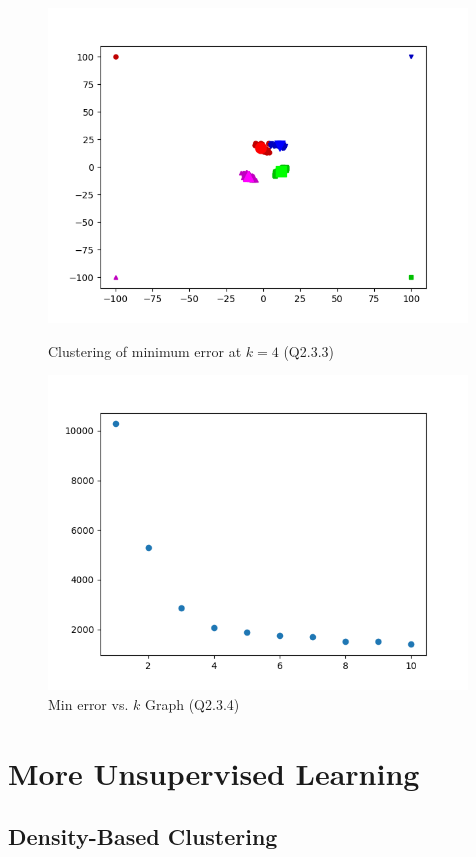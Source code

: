 \documentclass{article}
\begin{document}
\begin{figure}
    \includegraphics[width=30em]{a2_q2_3_3.png}
    \caption{Clustering of minimum error at $k=4$ (Q2.3.3)}
    \label{fig:q2_3_3}

    \includegraphics[width=30em]{a2_q2_3_4.png}
    \caption{Min error vs. $k$ Graph (Q2.3.4)}
    \label{fig:q2_3_4}
 \end{figure}

\section{More Unsupervised Learning}

\subsection{Density-Based Clustering}
\end{document}
